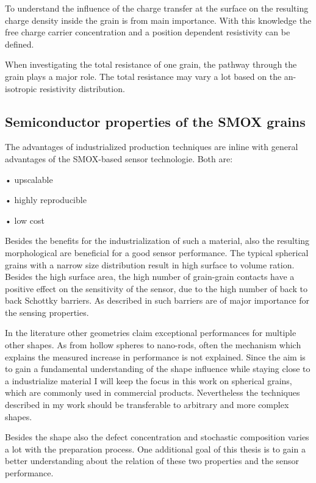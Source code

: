 \documentclass[11pt]{article}
\begin{document}
To understand the influence of the charge transfer at the surface on the
resulting charge density inside the grain is from main importance. With
this knowledge the free charge carrier concentration and a position
dependent resistivity can be defined.

When investigating the total resistance of one grain, the pathway
through the grain plays a major role. The total resistance may vary a
lot based on the an-isotropic resistivity distribution.

    \hypertarget{semiconductor-properties-of-the-smox-grains}{%
\subsection{Semiconductor properties of the SMOX
grains}\label{semiconductor-properties-of-the-smox-grains}}

The advantages of industrialized production techniques are inline with
general advantages of the SMOX-based sensor technologie. Both are:

• upscalable

• highly reproducible

• low cost

Besides the benefits for the industrialization of such a material, also
the resulting morphological are beneficial for a good sensor
performance. The typical spherical grains with a narrow size
distribution result in high surface to volume ration. Besides the high
surface area, the high number of grain-grain contacts have a positive
effect on the sensitivity of the sensor, due to the high number of back
to back Schottky barriers. As described in \cite{Barsan2003}
\cite{Barsan2011a} such barriers are of major importance for the sensing
properties.

In the literature other geometries claim exceptional performances for
multiple other shapes. As from hollow spheres to nano-rods, often the
mechanism which explains the measured increase in performance is not
explained. Since the aim is to gain a fundamental understanding of the
shape influence while staying close to a industrialize material I will
keep the focus in this work on spherical grains, which are commonly used
in commercial products. Nevertheless the techniques described in my work
should be transferable to arbitrary and more complex shapes.

Besides the shape also the defect concentration and stochastic
composition varies a lot with the preparation process. One additional
goal of this thesis is to gain a better understanding about the relation
of these two properties and the sensor performance.
\end{document}
